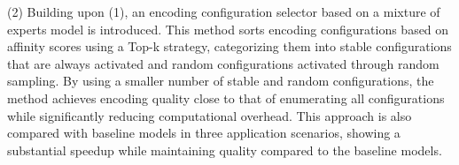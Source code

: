 \begin{abstract*}
  (2) Building upon (1), an encoding configuration selector based on a mixture of experts model is introduced. 
  This method sorts encoding configurations based on affinity scores using a Top-k strategy, 
  categorizing them into stable configurations that are always activated and random configurations activated through random sampling. 
  By using a smaller number of stable and random configurations, 
  the method achieves encoding quality close to that of enumerating all configurations while significantly reducing computational overhead. 
  This approach is also compared with baseline models in three application scenarios, 
  showing a substantial speedup while maintaining quality compared to the baseline models.

\end{abstract*}
